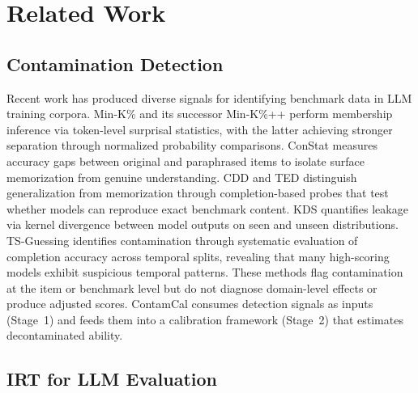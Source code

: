 \section{Related Work}
\label{sec:related_work}

\subsection{Contamination Detection}

Recent work has produced diverse signals for identifying benchmark data in LLM training corpora. Min-K\% \citep{shi_2023_minkprob} and its successor Min-K\%++ \citep{zhang_2024_minkpp} perform membership inference via token-level surprisal statistics, with the latter achieving stronger separation through normalized probability comparisons. ConStat \citep{dekoninck_2024_constat} measures accuracy gaps between original and paraphrased items to isolate surface memorization from genuine understanding. CDD and TED \citep{dong_2024_cdd} distinguish generalization from memorization through completion-based probes that test whether models can reproduce exact benchmark content. KDS \citep{choi_2025_kds} quantifies leakage via kernel divergence between model outputs on seen and unseen distributions. TS-Guessing \citep{deng_2024_tsguessing} identifies contamination through systematic evaluation of completion accuracy across temporal splits, revealing that many high-scoring models exhibit suspicious temporal patterns. These methods flag contamination at the item or benchmark level but do not diagnose domain-level effects or produce adjusted scores. ContamCal consumes detection signals as inputs (Stage~1) and feeds them into a calibration framework (Stage~2) that estimates decontaminated ability.

\subsection{IRT for LLM Evaluation}

